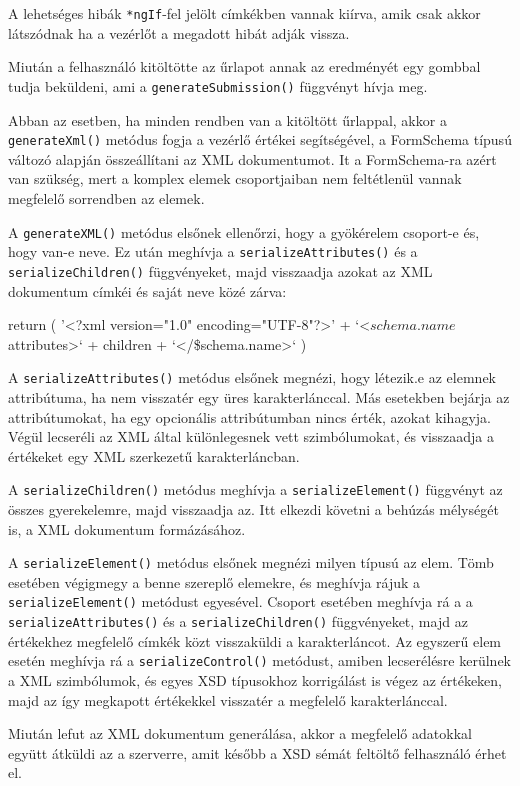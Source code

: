 A lehetséges hibák \texttt{*ngIf}-fel jelölt címkékben vannak kiírva, amik csak akkor látszódnak ha a vezérlőt a megadott hibát adják vissza.

Miután a felhasználó kitöltötte az űrlapot annak az eredményét egy gombbal tudja beküldeni, ami a \texttt{generateSubmission()} függvényt hívja meg.


Abban az esetben, ha minden rendben van a kitöltött űrlappal, akkor a \texttt{generateXml()} metódus fogja a vezérlő értékei segítségével, a FormSchema típusú változó alapján összeállítani az XML dokumentumot. It a FormSchema-ra azért van szükség, mert a komplex elemek csoportjaiban nem feltétlenül vannak megfelelő sorrendben az elemek. 

A \texttt{generateXML()} metódus elsőnek ellenőrzi, hogy a gyökérelem csoport-e és, hogy van-e neve. Ez után meghívja a \texttt{serializeAttributes()} és a \texttt{serializeChildren()} függvényeket, majd visszaadja azokat az XML dokumentum címkéi és saját neve közé zárva:

\begin{java}
return (
	'<?xml version="1.0" encoding="UTF-8"?>\n' +
	`<${schema.name}${attributes}>\n` + 
	children + `</\${schema.name}>`
)
\end{java}

A \texttt{serializeAttributes()} metódus elsőnek megnézi, hogy létezik.e az elemnek attribútuma, ha nem visszatér egy üres karakterlánccal. Más esetekben bejárja az attribútumokat, ha egy opcionális attribútumban nincs érték, azokat kihagyja. Végül lecseréli az XML által különlegesnek vett szimbólumokat, és visszaadja a értékeket egy XML szerkezetű karakterláncban.

A \texttt{serializeChildren()} metódus meghívja a \texttt{serializeElement()} függvényt az összes gyerekelemre, majd visszaadja az. Itt elkezdi követni a behúzás mélységét is, a XML dokumentum formázásához.

A \texttt{serializeElement()} metódus elsőnek megnézi milyen típusú az elem. Tömb esetében végigmegy a benne szereplő elemekre, és meghívja rájuk a \texttt{serializeElement()} metódust egyesével. Csoport esetében meghívja rá a a \texttt{serializeAttributes()} és a \texttt{serializeChildren()} függvényeket, majd az értékekhez megfelelő címkék közt visszaküldi a karakterláncot. Az egyszerű elem esetén meghívja rá a \texttt{serializeControl()} metódust, amiben lecserélésre kerülnek a XML szimbólumok, és egyes XSD típusokhoz korrigálást is végez az értékeken, majd az így megkapott értékekkel visszatér a megfelelő karakterlánccal.

Miután lefut az XML dokumentum generálása, akkor a megfelelő adatokkal együtt átküldi az a szerverre, amit később a XSD sémát feltöltő felhasználó érhet el.